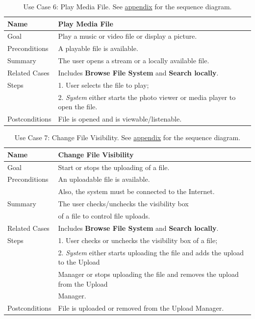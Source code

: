 \begin{table}[h!]
\centering
\begin{tabular}{|l|l|}
\hline
Name & Play Media File\\ \hline
Goal & Play a music or video file or display a picture.\\ \hline
Preconditions & A playable file is available. \\ \hline
Summary & The user opens a stream or a locally available file.\\ \hline
Related Cases & Includes \textbf{Browse File System} and \textbf{Search locally}. \\ \hline
Steps &  1. User selects the file to play; \\
      &  2. \textit{System} either starts the photo viewer or media player to open the file. 
        \\ \hline
Postconditions & File is opened and is viewable/listenable.
\\ \hline
\end{tabular}
\caption{Use Case 6: Play Media File. See \hyperref[fig:req_seq2]{appendix} for the sequence diagram.}
\label{tab:UC6}
\end{table}

\begin{table}[h!]
\centering
\begin{tabular}{|l|l|}
\hline
Name & Change File Visibility\\ \hline
Goal & Start or stops the uploading of a file.\\ \hline
Preconditions & An uploadable file is available. \\
& Also, the system must be connected to the Internet. \\ \hline
Summary & The user checks/unchecks the visibility box \\
& of a file to control file uploads.\\ \hline
Related Cases & Includes \textbf{Browse File System} and \textbf{Search locally}. \\ \hline
Steps &  1. User checks or unchecks the visibility box of a file; \\
      &  2. \textit{System} either starts uploading the file and adds the upload to the Upload \\
      &     Manager or  stops uploading the file and removes the upload from the Upload \\
      &     Manager.
        \\ \hline
Postconditions & File is uploaded or removed from the Upload Manager.
\\ \hline
\end{tabular}
\caption{Use Case 7: Change File Visibility. See \hyperref[fig:req_seq3]{appendix} for the sequence diagram.}
\label{tab:UC7}
\end{table}

